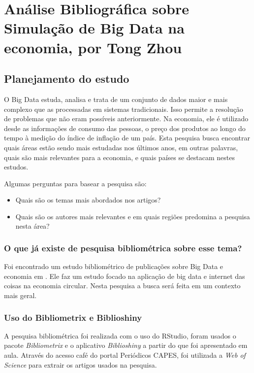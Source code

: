 \chapter{Análise Bibliográfica sobre Simulação de Big Data na economia, por Tong Zhou\label{chap:bibliometria:Tong00020}}


\section{Planejamento do estudo}

O Big Data estuda, analisa e trata de um conjunto de dados maior e mais complexo que as processadas em sistemas tradicionais. Isso permite a resolução de problemas que não eram possíveis anteriormente.
Na economia, ele é utilizado desde as informações de consumo das pessoas, o preço dos produtos ao longo do tempo à medição do índice de inflação de um país.
Esta pesquisa busca encontrar quais áreas estão sendo mais estudadas nos últimos anos, em outras palavras, quais são mais relevantes para a economia, e quais países se destacam nestes estudos.

Algumas perguntas para basear a pesquisa são:
\begin{itemize}
    \item Quais são os temas mais abordados nos artigos?
    \item Quais são os autores mais relevantes e em quais regiões predomina a pesquisa nesta área?
\end{itemize}


\subsection{O que já existe de pesquisa bibliométrica sobre esse tema?}
 Foi encontrado um estudo bibliométrico de publicações sobre Big Data e economia em  \cite{nobre_scientific_2017}. 
 Ele faz um estudo focado na aplicação de big data e internet das coisas na economia circular. Nesta pesquisa a busca será feita em um contexto mais geral. 


\subsection{Uso do Bibliometrix e Biblioshiny}

A pesquisa bibliométrica foi realizada com o uso do RStudio, foram usados o pacote \textit{Bibliometrix} e o aplicativo \textit{Biblioshiny} a partir do que foi apresentado em aula. Através do acesso café do portal Periódicos CAPES, foi utilizada a \textit{Web of Science} para extrair os artigos usados na pesquisa.


